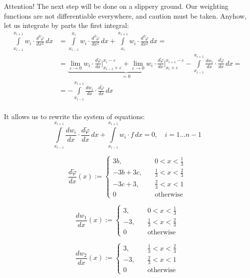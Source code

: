 \documentclass[notitlepage,oneside]{book}
\begin{document}
Attention! The next step will be done on a slippery ground.
Our weighting functions are not differentiable everywhere, and caution must be taken.
Anyhow, let us integrate by parts the first integral:
\begin{align*}
\int\limits_{x_{i-1}}^{x_{i+1}} w_i \cdot \frac{d^2\tilde{\varphi}}{dx^2}\,dx &= 
\int\limits_{x_{i-1}}^{x_{i}} w_i \cdot \frac{d^2\tilde{\varphi}}{dx^2}\,dx + 
\int\limits_{x_{i}}^{x_{i+1}} w_i \cdot \frac{d^2\tilde{\varphi}}{dx^2}\,dx = \\
& =\underbrace{\lim\limits_{\varepsilon\rightarrow 0}w_i\cdot \frac{d\tilde{\varphi}}{dx}\Big|_{x_{i-1}+\varepsilon}^{x_{i}-\varepsilon} +
\lim\limits_{\varepsilon\rightarrow 0}w_i\cdot \frac{d\tilde{\varphi}}{dx}\Big|_{x_{i}+\varepsilon}^{x_{i+1}-\varepsilon}}_{= 0} - \int\limits_{x_{i-1}}^{x_{i+1}} \frac{dw_i}{dx}\cdot \frac{d\tilde{\varphi}}{dx}\,dx  = \\
& = - \int\limits_{x_{i-1}}^{x_{i+1}} \frac{dw_i}{dx}\cdot \frac{d\tilde{\varphi}}{dx}\,dx \\
\end{align*}

It allows us to rewrite the system of equations:
\begin{equation}
\label{eq:galerkin:system}
\int\limits_{x_{i-1}}^{x_{i+1}} \frac{dw_i}{dx} \cdot \frac{d\tilde{\varphi}}{dx}\,dx + \int\limits_{x_{i-1}}^{x_{i+1}} w_i\cdot f\,dx = 0, \quad i = 1\dots n-1
\end{equation}

$$
\frac{d\tilde{\varphi}}{dx} (x) := \left\{
\begin{split}
3b, & \quad 0 < x < \frac{1}{3}\\
-3b+3c, & \quad \frac{1}{3} < x < \frac{2}{3}\\
-3c+3, & \quad \frac{2}{3} < x < 1\\
0 & \quad \text{otherwise}
\end{split}
\right.
$$

$$
\frac{dw_1}{dx} (x) := \left\{
\begin{split}
3, & \quad 0 < x < \frac{1}{3}\\
-3, & \quad \frac{1}{3} < x < \frac{2}{3}\\
0 & \quad \text{otherwise}
\end{split}
\right.
$$

$$
\frac{dw_2}{dx} (x) := \left\{
\begin{split}
3, & \quad \frac{1}{3} < x < \frac{2}{3}\\
-3, & \quad \frac{2}{3} < x < 1\\
0 & \quad \text{otherwise}
\end{split}
\right.
$$
\end{document}
